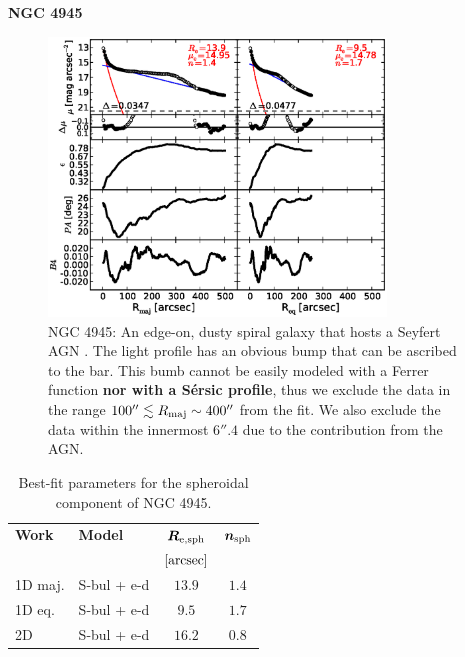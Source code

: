 \documentclass[preprint2]{emulateapj}
\newcommand{\fitfigurewidth}{0.8\textwidth}
\begin{document}
  \clearpage\newpage\noindent
  {\bf NGC 4945 \\}

  \begin{figure}[h]
  \begin{center}
  \includegraphics[width=\fitfigurewidth]{n4945_1Dfit.eps}
  \caption{NGC 4945: 
  An edge-on, dusty spiral galaxy that hosts a Seyfert AGN \citep{lin2011}.
  The light profile has an obvious bump that can be ascribed to the bar.
  This bumb cannot be easily modeled with a Ferrer function {\bf nor with a S\'ersic profile}, 
  thus we exclude the data in the range $100'' \lesssim R_{\rm maj} \sim 400''$ from the fit.
  We also exclude the data within the innermost $6''.4$ due to the contribution from the AGN.
  }
  \end{center}
  \end{figure}

  \begin{table}[h]
  \small
  \caption{Best-fit parameters for the spheroidal component of NGC 4945.}
  \begin{center}
  \begin{tabular}{llcc}
  \hline
  {\bf Work} & {\bf Model}   & $\bm R_{\rm e,sph}$    & $\bm n_{\rm sph}$ \\
    &  &  $[\rm arcsec]$ & \\
  \hline
  1D maj. & S-bul + e-d & $13.9$  &  $1.4$ \\
  1D eq.  & S-bul + e-d & $9.5$   &  $1.7$ \\
  2D      & S-bul + e-d & $16.2$  &  $0.8$ \\
  \hline
  \end{tabular}
  \end{center}
  \label{tab:n4945}
  \end{table}
\end{document}

